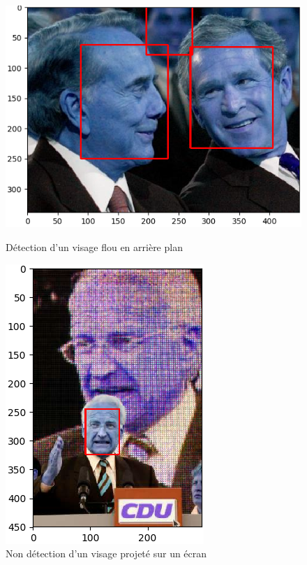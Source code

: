 \documentclass[a4paper,11pt]{article}
\begin{document}
\begin{figure}[H]
    \centering
    \begin{minipage}[c]{0.58\linewidth}
        \begin{center}
            \includegraphics[scale=0.45]{facenetTP1.png}
            \caption{Détection d'un visage flou en arrière plan}
        \end{center}
    \end{minipage} \hfill
    \begin{minipage}[c]{0.35\linewidth}
        \begin{center}
            \includegraphics[scale=0.45]{facenetTP2.png}
            \caption{Non détection d'un visage projeté sur un écran}
            \label{fig:proj_ecran}
        \end{center}
    \end{minipage}
\end{figure}
\end{document}
